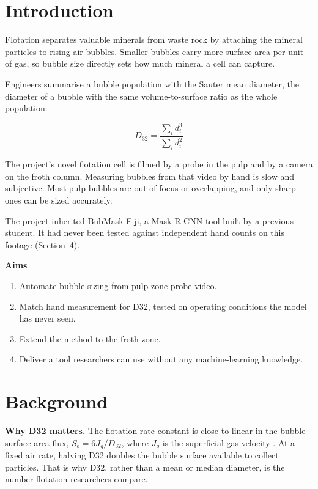 \hypertarget{introduction}{%
\section{Introduction}\label{introduction}}

Flotation separates valuable minerals from waste rock by attaching the
mineral particles to rising air bubbles. Smaller bubbles carry more
surface area per unit of gas, so bubble size directly sets how much
mineral a cell can capture.

Engineers summarise a bubble population with the Sauter mean diameter,
the diameter of a bubble with the same volume-to-surface ratio as the
whole population:

\[D_{32} = \frac{\sum_i d_i^3}{\sum_i d_i^2}\]

The project's novel flotation cell is filmed by a probe in the pulp and
by a camera on the froth column. Measuring bubbles from that video by
hand is slow and subjective. Most pulp bubbles are out of focus or
overlapping, and only sharp ones can be sized accurately.

The project inherited BubMask-Fiji, a Mask R-CNN tool built by a
previous student. It had never been tested against independent hand
counts on this footage (Section~4).

\textbf{Aims}

\begin{enumerate}
\def\labelenumi{\arabic{enumi}.}
\tightlist
\item
  Automate bubble sizing from pulp-zone probe video.
\item
  Match hand measurement for D32, tested on operating conditions the
  model has never seen.
\item
  Extend the method to the froth zone.
\item
  Deliver a tool researchers can use without any machine-learning
  knowledge.
\end{enumerate}

\hypertarget{background}{%
\section{Background}\label{background}}

\textbf{Why D32 matters.} The flotation rate constant is close to linear
in the bubble surface area flux, \(S_b = 6J_g/D_{32}\), where \(J_g\) is
the superficial gas velocity \citep{gorain1997, gorain1999, finch2000}.
At a fixed air rate, halving D32 doubles the bubble surface available to
collect particles. That is why D32, rather than a mean or median
diameter, is the number flotation researchers compare.

